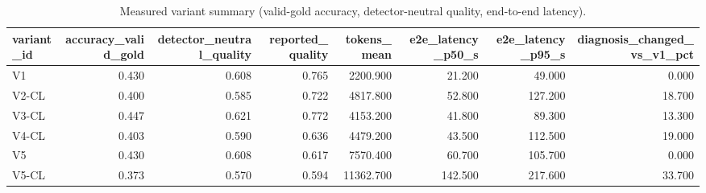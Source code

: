 \begin{table}[t]
\centering
\small
\begin{tabular}{lrrrrrrr}
\toprule
variant\_id & accuracy\_valid\_gold & detector\_neutral\_quality & reported\_quality & tokens\_mean & e2e\_latency\_p50\_s & e2e\_latency\_p95\_s & diagnosis\_changed\_vs\_v1\_pct \\
\midrule
V1 & 0.430 & 0.608 & 0.765 & 2200.900 & 21.200 & 49.000 & 0.000 \\
V2-CL & 0.400 & 0.585 & 0.722 & 4817.800 & 52.800 & 127.200 & 18.700 \\
V3-CL & 0.447 & 0.621 & 0.772 & 4153.200 & 41.800 & 89.300 & 13.300 \\
V4-CL & 0.403 & 0.590 & 0.636 & 4479.200 & 43.500 & 112.500 & 19.000 \\
V5 & 0.430 & 0.608 & 0.617 & 7570.400 & 60.700 & 105.700 & 0.000 \\
V5-CL & 0.373 & 0.570 & 0.594 & 11362.700 & 142.500 & 217.600 & 33.700 \\
\bottomrule
\end{tabular}
\caption{Measured variant summary (valid-gold accuracy, detector-neutral quality, end-to-end latency).}
\label{tab:rigor_variants}
\end{table}
